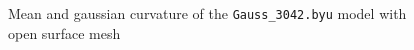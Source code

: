 \documentclass[a4paper,10pt,notitlepage]{scrreprt}
\begin{document}
\begin{figure}
 \caption{Mean and gaussian curvature of the \texttt{Gauss\_3042.byu} model with
open surface mesh}
 \label{fig:curvature-gauss}
\end{figure}

% 
\end{document}

